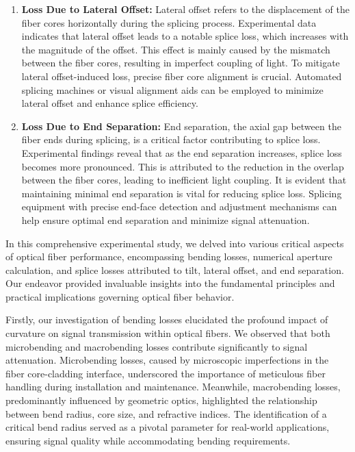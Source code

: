 \begin{itemize}
\begin{enumerate}
         \item \textbf{Loss Due to Lateral Offset:} Lateral offset refers to the displacement of the fiber cores horizontally during the splicing process. Experimental data indicates that lateral offset leads to a notable splice loss, which increases with the magnitude of the offset. This effect is mainly caused by the mismatch between the fiber cores, resulting in imperfect coupling of light. To mitigate lateral offset-induced loss, precise fiber core alignment is crucial. Automated splicing machines or visual alignment aids can be employed to minimize lateral offset and enhance splice efficiency.

        \item \textbf{Loss Due to End Separation:} End separation, the axial gap between the fiber ends during splicing, is a critical factor contributing to splice loss. Experimental findings reveal that as the end separation increases, splice loss becomes more pronounced. This is attributed to the reduction in the overlap between the fiber cores, leading to inefficient light coupling. It is evident that maintaining minimal end separation is vital for reducing splice loss. Splicing equipment with precise end-face detection and adjustment mechanisms can help ensure optimal end separation and minimize signal attenuation.
    \end{enumerate}
    In this comprehensive experimental study, we delved into various critical aspects of optical fiber performance, encompassing bending losses, numerical aperture calculation, and splice losses attributed to tilt, lateral offset, and end separation. Our endeavor provided invaluable insights into the fundamental principles and practical implications governing optical fiber behavior.
    
Firstly, our investigation of bending losses elucidated the profound impact of curvature on signal transmission within optical fibers. We observed that both microbending and macrobending losses contribute significantly to signal attenuation. Microbending losses, caused by microscopic imperfections in the fiber core-cladding interface, underscored the importance of meticulous fiber handling during installation and maintenance. Meanwhile, macrobending losses, predominantly influenced by geometric optics, highlighted the relationship between bend radius, core size, and refractive indices. The identification of a critical bend radius served as a pivotal parameter for real-world applications, ensuring signal quality while accommodating bending requirements.


\end{itemize}
